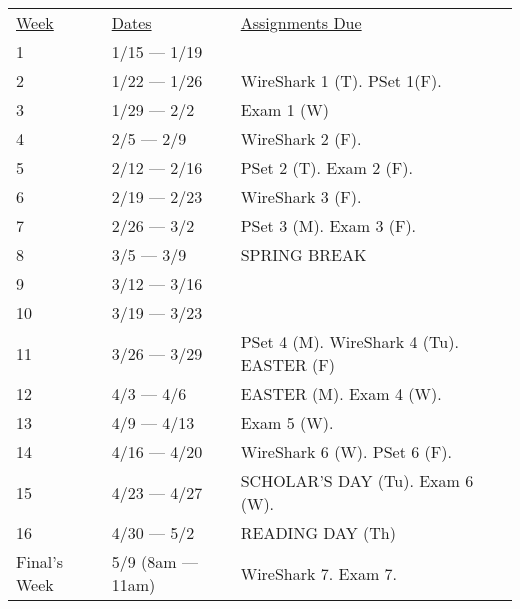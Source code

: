 \documentclass[10pt]{article}
\begin{document}
\begin{center}
\begin{tabular}{lll}
\underline{Week} & \underline{Dates} & \underline{Assignments Due}  \\
1 & 1/15 --- 1/19 &  \\
2 & 1/22 --- 1/26 & WireShark 1 (T). PSet 1(F). \\
3 & 1/29 --- 2/2 & Exam 1 (W)  \\
4 & 2/5 --- 2/9 & WireShark 2 (F).\\
5 & 2/12 --- 2/16 &  PSet 2 (T). Exam 2 (F). \\
6 & 2/19 --- 2/23 & WireShark 3 (F).  \\
7 & 2/26 --- 3/2 &  PSet 3 (M). Exam 3 (F).   \\
8 & 3/5 --- 3/9 & SPRING BREAK \\
9 & 3/12 --- 3/16 &   \\
10 & 3/19 --- 3/23 &   \\
11 & 3/26 --- 3/29 & PSet 4 (M). WireShark 4 (Tu). EASTER (F)    \\
12 & 4/3 --- 4/6 & EASTER (M). Exam 4 (W).   \\
13 & 4/9 --- 4/13 &  Exam 5 (W).  \\
14 & 4/16 --- 4/20 &  WireShark 6 (W). PSet 6 (F). \\
15 & 4/23 --- 4/27 & SCHOLAR'S DAY (Tu).  Exam 6 (W).   \\
16 & 4/30 --- 5/2 & READING DAY (Th)  \\
Final's Week & 5/9 (8am --- 11am) & WireShark 7. Exam 7.    \\
\end{tabular}
\end{center}
\end{document}
